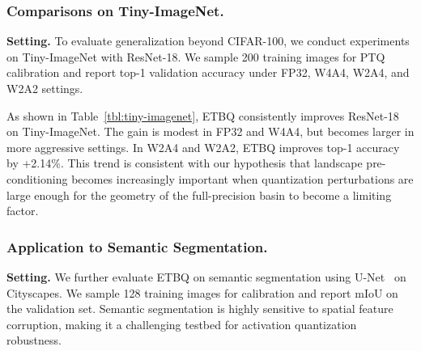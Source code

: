 \documentclass{article}
\begin{document}
\begin{table}[h!]
\centering
\caption{Top-1 accuracy (\%) on the Tiny-ImageNet validation set. The baseline applies PTQ directly on the standard SGD model, while ETBQ pre-conditions the loss landscape before quantization.}
\label{tbl:tiny-imagenet}
\end{table}

\subsubsection{Comparisons on Tiny-ImageNet.}
\textbf{Setting.}
To evaluate generalization beyond CIFAR-100, we conduct experiments on Tiny-ImageNet with ResNet-18. We sample 200 training images for PTQ calibration and report top-1 validation accuracy under FP32, W4A4, W2A4, and W2A2 settings.

As shown in Table~\ref{tbl:tiny-imagenet}, ETBQ consistently improves ResNet-18 on Tiny-ImageNet. The gain is modest in FP32 and W4A4, but becomes larger in more aggressive settings. In W2A4 and W2A2, ETBQ improves top-1 accuracy by +2.14\%. This trend is consistent with our hypothesis that landscape pre-conditioning becomes increasingly important when quantization perturbations are large enough for the geometry of the full-precision basin to become a limiting factor.

\subsubsection{Application to Semantic Segmentation.}
\textbf{Setting.}
We further evaluate ETBQ on semantic segmentation using U-Net~\cite{ronneberger2015u} on Cityscapes. We sample 128 training images for calibration and report mIoU on the validation set. Semantic segmentation is highly sensitive to spatial feature corruption, making it a challenging testbed for activation quantization robustness.
\end{document}
